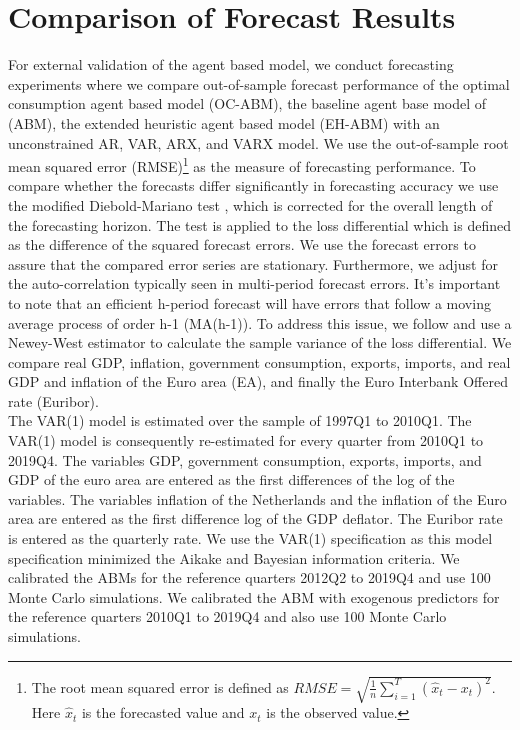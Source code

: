 
\section{Comparison of Forecast Results} %

\label{Forecasts} %
For external validation of the agent based model, we conduct forecasting experiments where we compare out-of-sample forecast performance of the optimal consumption agent based model (OC-ABM), the baseline agent base model of \cite{poledna_economic_2019} (ABM), the extended heuristic agent based model (EH-ABM) with an unconstrained AR, VAR, ARX, and VARX model. We use the out-of-sample root mean squared error (RMSE)\footnote{The root mean squared error is defined as $RMSE = \sqrt{\frac{1}{n} \sum_{i=1}^T(\hat{x}_t-x_t)^2}$. Here $\hat{x}_t$ is the forecasted value and $x_t$ is the observed value.} as the measure of forecasting performance. To compare whether the forecasts differ significantly in forecasting accuracy we use the modified Diebold-Mariano test \citep{harveyTestingEqualityPrediction1997}, which is corrected for the overall length of the forecasting horizon. The test is applied to the loss differential which is defined as the difference of the squared forecast errors. We use the forecast errors to assure that the compared error series are stationary. Furthermore, we adjust for the auto-correlation typically seen in multi-period forecast errors. It’s important to note that an efficient h-period forecast will have errors that follow a moving average process of order h-1 (MA(h-1)). To address this issue, we follow \cite{harveyTestingEqualityPrediction1997} and use a Newey-West estimator to calculate the sample variance of the loss differential. We compare real GDP, inflation, government consumption, exports, imports, and real GDP and inflation of the Euro area (EA), and finally the Euro Interbank Offered rate (Euribor).\\

The VAR(1) model is estimated over the sample of 1997Q1 to 2010Q1. The VAR(1) model is consequently re-estimated for every quarter from 2010Q1 to 2019Q4. The variables GDP, government consumption, exports, imports, and GDP of the euro area are entered as the first differences of the log of the variables. The variables inflation of the Netherlands and the inflation of the Euro area are entered as the first difference log of the GDP deflator. The Euribor rate is entered as the quarterly rate. We use the VAR(1) specification as this model specification minimized the Aikake and Bayesian information criteria. We calibrated the ABMs for the reference quarters 2012Q2 to 2019Q4 and use 100 Monte Carlo simulations. We calibrated the ABM with exogenous predictors for the reference quarters 2010Q1 to 2019Q4 and also use 100 Monte Carlo simulations.\\

